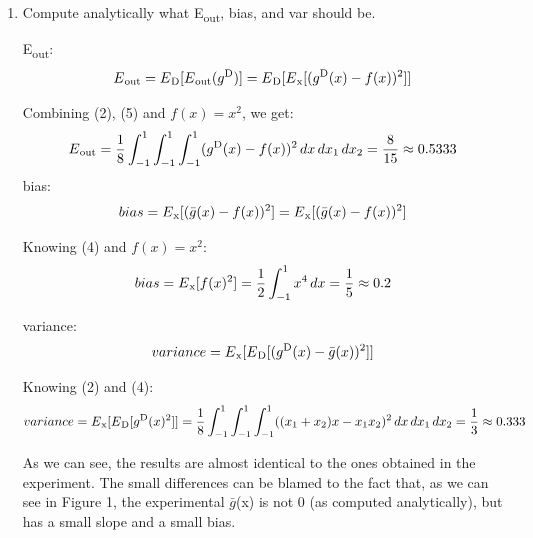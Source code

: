 \documentclass{article}
\begin{document}
\begin{enumerate}[label=(\alph*)]
\item Compute analytically what E\textsubscript{out}, bias, and var should be.

E\textsubscript{out}:
\begin{equation}
E\textsubscript{out} = E\textsubscript{D}[E\textsubscript{out}(g\textsuperscript{D})] = E\textsubscript{D}[E\textsubscript{x}[(g\textsuperscript{D}(x) - f(x))^2]]
\end{equation}

Combining (2), (5) and $f(x) = x^2$, we get:
\[
E\textsubscript{out} = \frac{1}{8} \int_{-1}^{1} \int_{-1}^{1} \int_{-1}^{1} (g\textsuperscript{D}(x) - f(x))^2 \,dx\,dx\textsubscript{1}\,dx\textsubscript{2} = \frac{8}{15} \approx 0.5333
\]
bias:
\begin{equation}
bias = E\textsubscript{x}[(\bar{g}(x) - f(x))^2] = E\textsubscript{x}[(\bar{g}(x) - f(x))^2]
\end{equation}

Knowing (4) and $f(x) = x^2$:
\[
bias = E\textsubscript{x}[f(x)^2] = \frac{1}{2} \int_{-1}^{1} x^4 \,dx = \frac{1}{5} \approx 0.2
\]

variance:
\begin{equation}
variance = E\textsubscript{x}[E\textsubscript{D}[(g\textsuperscript{D}(x) - \bar{g}(x))^2]]
\end{equation}

Knowing (2) and (4):
\[
variance = E\textsubscript{x}[E\textsubscript{D}[g\textsuperscript{D}(x)^2]] = \frac{1}{8} \int_{-1}^{1} \int_{-1}^{1} \int_{-1}^{1} ((x\textsubscript{1} + x\textsubscript{2})x - x\textsubscript{1}x\textsubscript{2})^2 \,dx\,dx\textsubscript{1}\,dx\textsubscript{2} = \frac{1}{3} \approx 0.333
\]

As we can see, the results are almost identical to the ones obtained in the experiment. The small differences can be blamed to the fact that, as we can see in Figure 1, the experimental $\bar{g}$(x) is not 0 (as computed analytically), but has a small slope and a small bias.

\end{enumerate}
\end{document}
